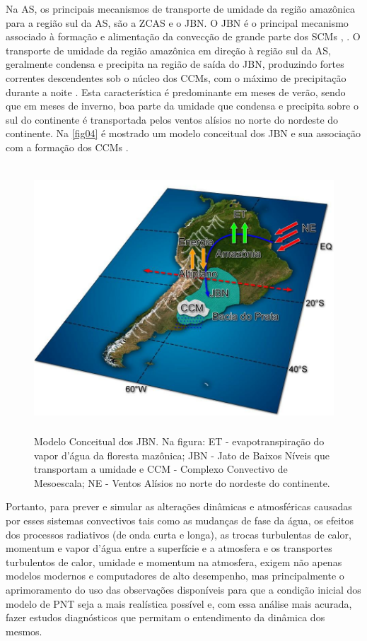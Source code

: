 Na AS, os principais mecanismos de transporte de umidade da região amazônica para a região sul da AS, são a ZCAS e o JBN. O JBN é o principal mecanismo associado à formação e alimentação da convecção de grande parte dos SCMs \cite{ferreiraetal03}, \cite{herdiesetal02}. O transporte de umidade da região amazônica em direção à região sul da AS, geralmente condensa e precipita na região de saída do JBN, produzindo fortes correntes descendentes sob o núcleo dos CCMs, com o máximo de precipitação durante a noite \cite{noguesetal00}. Esta característica é predominante em meses de verão, sendo que em meses de inverno, boa parte da umidade que condensa e precipita sobre o sul do continente é transportada pelos ventos alísios no norte do nordeste do continente. Na \autoref{fig04} é mostrado um modelo conceitual dos JBN e sua associação com a formação dos CCMs \cite{marengoetal04}.

\begin{figure}
\includegraphics[height=10cm]{./figs/fig10.png}
\caption{Modelo Conceitual dos JBN. Na figura: ET - evapotranspiração do vapor d'água da floresta mazônica; JBN - Jato de Baixos Níveis que transportam a umidade e CCM - Complexo Convectivo de Mesoescala; NE - Ventos Alísios no norte do nordeste do continente.}
\label{fig04}
\end{figure}

Portanto, para prever e simular as alterações dinâmicas e atmosféricas causadas por esses sistemas convectivos tais como as mudanças de fase da água, os efeitos dos processos radiativos (de onda curta e longa), as trocas turbulentas de calor, momentum e vapor d'água entre a superfície e a atmosfera e os transportes turbulentos de calor, umidade e momentum na atmosfera, exigem não apenas modelos modernos e computadores de alto desempenho, mas principalmente o aprimoramento do uso das observações disponíveis para que a condição inicial dos modelo de PNT seja a mais realística possível e, com essa análise mais acurada, fazer estudos diagnósticos que permitam o entendimento da dinâmica dos mesmos.

